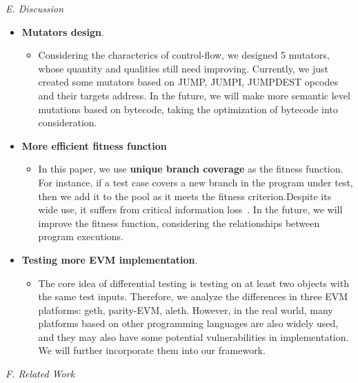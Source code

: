 \documentclass[a4paper]{article}
\begin{document}
	\textit{E. Discussion}
	\begin{itemize}
		\item \textbf{Mutators design}. 
		\begin{itemize}
			\item Considering the characterics of control-flow, we designed 5 mutators,
			whose quantity and qualities still need improving. Currently, we just created some mutators based on JUMP, JUMPI, JUMPDEST opcodes and their targets address. In the future, we
			will make more semantic level mutations based on bytecode, taking the optimization of bytecode into consideration.
		\end{itemize}
		\item \textbf{More efficient fitness function}
		\begin{itemize}
			\item In this paper, we use
			\textbf{unique branch coverage} as the fitness function. For instance, if a test case
			covers a new branch in the program under test, then we add it to
			the pool as it meets the fitness criterion.Despite its wide use, it suffers from critical information loss~. In the future, we will improve the fitness function, considering the relationships between program executions.
		\end{itemize}
		
		\item \textbf{Testing more EVM  implementation}. 
		\begin{itemize}
			\item The core idea of
			differential testing is testing on at least two objects with the
			same test inputs. Therefore, we analyze the differences in three
			EVM platforms: geth, parity-EVM, aleth. However, in
			the real world, many platforms based on other programming
			languages are also widely used, and they may also have some
			potential vulnerabilities in implementation. We will further incorporate them into our framework.
		\end{itemize}
	\end{itemize}
	\textit{F. Related Work}
\end{document}
